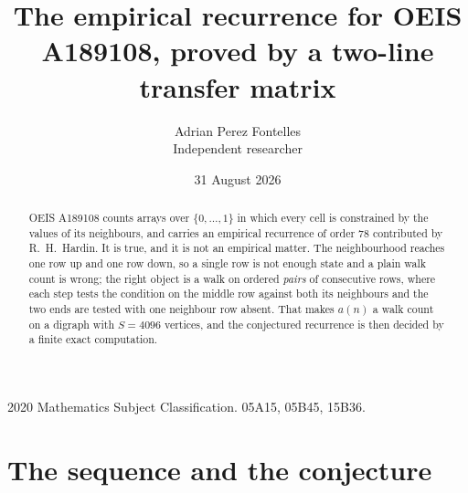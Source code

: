 \documentclass[11pt,a4paper]{article}
\title{The empirical recurrence for OEIS A189108, proved by a two-line transfer matrix}
\author{Adrian Perez Fontelles\\ \small Independent researcher}
\date{31 August 2026}
\theoremstyle{plain}
\theoremstyle{definition}
\begin{document}
\maketitle

\begin{abstract}
OEIS A189108 counts arrays over $\{0,\dots,1\}$ in which every cell is constrained by the
values of its neighbours, and carries an empirical recurrence of order $78$ contributed
by R.~H.~Hardin. It is true, and it is not an empirical matter. The neighbourhood reaches one
row up and one row down, so a single row is not enough state and a plain walk count
is wrong; the right object is a walk on ordered \emph{pairs} of consecutive rows, where
each step tests the condition on the middle row against both its neighbours and the two
ends are tested with one neighbour row absent. That makes $a(n)$ a walk count on a digraph
with $S=4096$ vertices, and the conjectured recurrence is then decided by a finite exact
computation.
\end{abstract}

\noindent\small 2020 Mathematics Subject Classification. 05A15, 05B45, 15B36.\normalsize

\section{The sequence and the conjecture}
\end{document}
